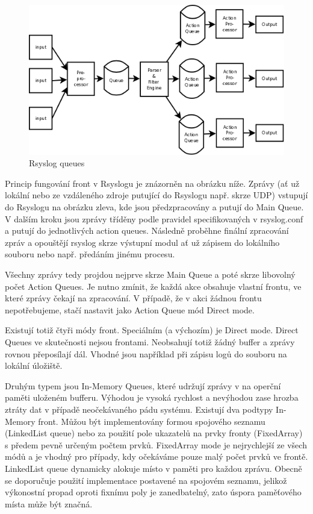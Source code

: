 \documentclass[thesis=B,czech]{FITthesis}[2012/06/26]
\begin{document}
\begin{figure}[ht]
	\centering
	\includegraphics[scale=0.4]{images/rsyslog-queues}
	\caption[Rsyslog queues]{Rsyslog queues~\cite{RsyslogQueues}}
\end{figure}

Princip fungování front v Rsyslogu je znázorněn na obrázku níže. Zprávy (ať už lokální nebo ze vzdáleného zdroje putující do Rsyslogu např. skrze UDP) vstupují do Rsyslogu  na obrázku zleva, kde jsou předzpracovány a putují do Main Queue. V dalším kroku jsou zprávy tříděny podle pravidel specifikovaných v rsyslog.conf a putují do jednotlivých action queues. Následně proběhne finální zpracování zpráv a opouštějí rsyslog skrze výstupní modul ať už zápisem do lokálního souboru nebo např. předáním jinému procesu.

Všechny zprávy tedy projdou nejprve skrze Main Queue a poté skrze libovolný počet Action Queues. Je nutno zmínit, že každá akce obsahuje vlastní frontu, ve které zprávy čekají na zpracování. V případě, že v akci žádnou frontu nepotřebujeme, stačí nastavit jako Action Queue mód Direct mode.

Existují totiž čtyři módy front. Speciálním (a výchozím) je Direct mode. Direct Queues ve skutečnosti nejsou frontami. Neobsahují totiž žádný buffer a zprávy rovnou přeposílají dál. Vhodné jsou například při zápisu logů do souboru na lokální úložiště.

Druhým typem jsou In-Memory Queues, které udržují zprávy v na operční paměti uloženém bufferu. Výhodou je vysoká rychlost a nevýhodou zase hrozba ztráty dat v případě neočekávaného pádu systému.
Existují dva podtypy In-Memory front. Můžou být implementovány formou spojového seznamu (LinkedList queue) nebo za použití pole ukazatelů na prvky fronty (FixedArray) s předem pevně určeným počtem prvků. FixedArray mode je nejrychlejší ze všech módů a je vhodný pro případy, kdy očekáváme pouze malý počet prvků ve frontě. LinkedList queue dynamicky alokuje místo v paměti pro každou zprávu.
Obecně se doporučuje použití implementace postavené na spojovém seznamu, jelikož výkonostní propad oproti fixnímu poly je zanedbatelný, zato úspora paměťového místa může být značná.
 
\end{document}
